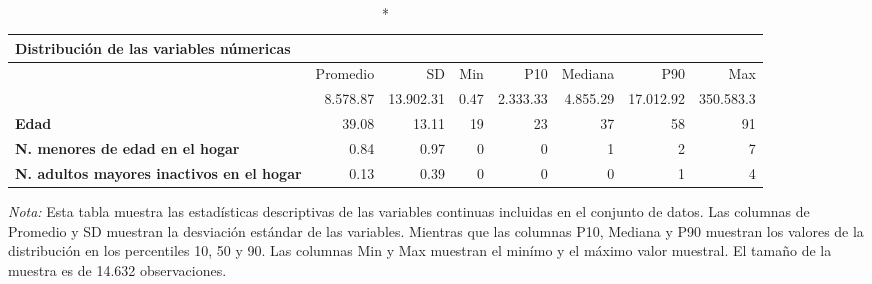 \centering \footnotesize \setlength{\tabcolsep}{4pt} \renewcommand{\arraystretch}{0.8}
\begingroup
\fontsize{7.0pt}{8.5pt}\selectfont
\begin{longtable}{lrrrrrrr}
\caption*{
{\large Distribución de las variables númericas}
} \\ 
\toprule
  & Promedio & SD & Min & P10 & Mediana & P90 & Max \\ 
\midrule\addlinespace[2.5pt]
{\bfseries Ingresos laborales por hora} & 8.578.87 & 13.902.31 & 0.47 & 2.333.33 & 4.855.29 & 17.012.92 & 350.583.3 \\ 
{\bfseries Edad} & 39.08 & 13.11 & 19 & 23 & 37 & 58 & 91 \\ 
{\bfseries N. menores de edad en el hogar} & 0.84 & 0.97 & 0 & 0 & 1 & 2 & 7 \\ 
{\bfseries N. adultos mayores inactivos en el hogar} & 0.13 & 0.39 & 0 & 0 & 0 & 1 & 4 \\ 
\bottomrule
\end{longtable}
\endgroup
\begin{minipage}{0.8\textwidth}
                                   \begin{tablenotes}
                                   \item \footnotesize \textit{Nota:} Esta tabla muestra las estadísticas descriptivas de las variables continuas incluidas en el conjunto de datos.
                                   Las columnas de Promedio y SD muestran la desviación estándar de las variables. Mientras que las columnas P10, Mediana y P90 muestran los valores de la distribución en los percentiles 10, 50 y 90.
                                   Las columnas Min y Max muestran el minímo y el máximo valor muestral.
                                   El tamaño de la muestra es de 14.632 observaciones.
                                   \end{tablenotes}
                                   \end{minipage}
